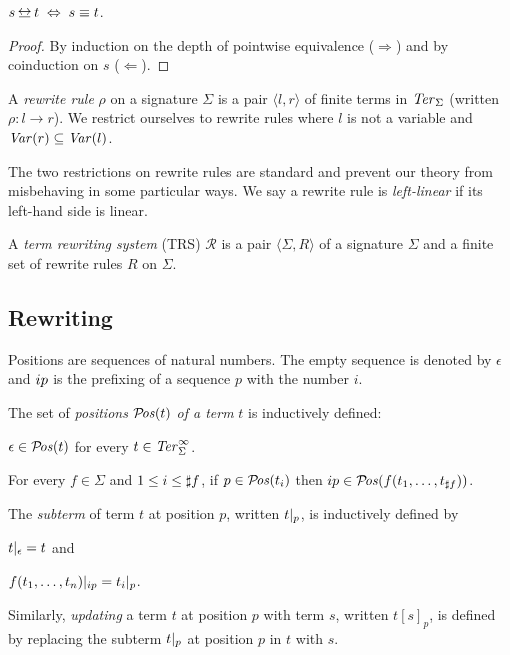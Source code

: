 \begin{proposition}\label{prop:equalities}
$s \bis t \; \Leftrightarrow \; s \equiv t$.
\end{proposition}
\begin{proof}
By induction on the depth of pointwise equivalence ($\Rightarrow$) and
by coinduction on $s$ ($\Leftarrow$).
\end{proof}

\begin{definition}%
  A \emph{rewrite rule} $\rho$ on a signature $\Sigma$ is a pair
  $\langle l, r \rangle$ of finite terms in $\mathit{Ter}_\Sigma$ (written $\rho : l
  \rightarrow r$). We restrict ourselves to rewrite rules where $l$ is
  not a variable and $\mathit{Var}(r) \subseteq \mathit{Var}(l)$.
\end{definition}

The two restrictions on rewrite rules are standard and prevent our
theory from misbehaving in some particular ways. We say a rewrite rule
is \emph{left-linear} if its left-hand side is linear.

\begin{definition}%
A \emph{term rewriting system} (TRS) $\mathcal{R}$ is a pair $\langle \Sigma,
R \rangle$ of a signature $\Sigma$ and a finite set of rewrite rules
$R$ on $\Sigma$.
\end{definition}


\subsection{Rewriting}

Positions are sequences of natural numbers. The empty sequence is
denoted by $\epsilon$ and $i p$ is the prefixing of a
sequence $p$ with the number $i$.

\begin{definition}%
  The set of \emph{positions} $\mathcal{P}\!\mathit{os}(t)$ \emph{of a term} $t$ is
  inductively defined:
  \begin{compactenum}
    \item $\epsilon \in \mathcal{P}\!\mathit{os}(t)$ for every $t \in \mathit{Ter}_\Sigma^\infty$.
    \item For every $f \in \Sigma$ and $1 \le i \le \sharp f$, if $p
      \in \mathcal{P}\!\mathit{os}(t_i)$ then $i p \in \mathcal{P}\!\mathit{os}(f(t_1, \ldots,
      t_{\sharp f}))$.
  \end{compactenum}
  The \emph{subterm} of term $t$ at position $p$, written
  $t |_{p}$, is inductively defined by
  \begin{inparaenum}[(i)]
    \item $t |_{\epsilon} = t$ and
    \item $f(t_1, \ldots, t_n) |_{i p} =
      t_i |_{p}$.
  \end{inparaenum}
  Similarly, \emph{updating} a term $t$ at position $p$ with term $s$,
  written $t[s]_p$, is defined by replacing the subterm
  $t |_{p}$ at position $p$ in $t$ with $s$.
\end{definition}

